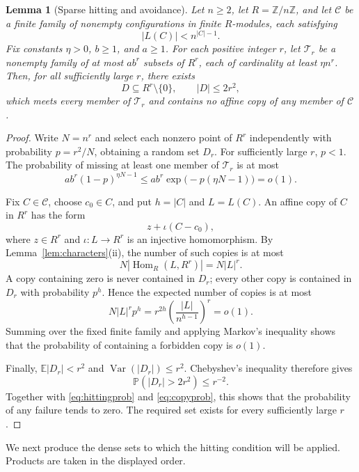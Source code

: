 \documentclass[10pt,a4paper]{amsart}
\newtheorem{lemma}[theorem]{Lemma}
\numberwithin{equation}{section}
\newcommand{\Hom}{\operatorname{Hom}}
\newcommand{\Z}{\mathbb{Z}}
\newcommand{\E}{\mathbb{E}}
\newcommand{\Prb}{\mathbb{P}}
\newcommand{\calC}{\mathcal{C}}
\renewcommand{\leq}{\leqslant}
\renewcommand{\geq}{\geqslant}
\begin{document}
\begin{lemma}[Sparse hitting and avoidance]\label{lem:sparse}
Let $n\geq 2$, let $R=\Z/n\Z$, and let $\calC$ be a finite family of nonempty configurations in finite $R$-modules, each satisfying
\[
 |L(C)|<n^{|C|-1}.
\]
Fix constants $\eta>0$, $b\geq 1$, and $a\geq 1$. For each positive integer $r$, let $\mathcal{T}_r$ be a nonempty family of at most $ab^r$ subsets of $R^r$, each of cardinality at least $\eta n^r$. Then, for all sufficiently large $r$, there exists
\[
 D\subseteq R^r\setminus\{0\},\qquad |D|\leq 2r^2,
\]
which meets every member of $\mathcal{T}_r$ and contains no affine copy of any member of $\calC$.
\end{lemma}
\begin{proof}
Write $N=n^r$ and select each nonzero point of $R^r$ independently with probability $p=r^2/N$, obtaining a random set $D_r$. For sufficiently large $r$, $p<1$. The probability of missing at least one member of $\mathcal{T}_r$ is at most
\begin{equation}\label{eq:hittingprob}
 ab^r(1-p)^{\eta N-1}
 \leq ab^r\exp\bigl(-p(\eta N-1)\bigr)=o(1).
\end{equation}

Fix $C\in\calC$, choose $c_0\in C$, and put $h=|C|$ and $L=L(C)$. An affine copy of $C$ in $R^r$ has the form
\[
 z+\iota(C-c_0),
\]
where $z\in R^r$ and $\iota:L\to R^r$ is an injective homomorphism. By Lemma~\ref{lem:characters}(ii), the number of such copies is at most
\[
 N|\Hom_R(L,R^r)|=N|L|^r.
\]
A copy containing zero is never contained in $D_r$; every other copy is contained in $D_r$ with probability $p^h$. Hence the expected number of copies is at most
\begin{equation}\label{eq:copyprob}
 N|L|^r p^h
 =r^{2h}\left(\frac{|L|}{n^{h-1}}\right)^r=o(1).
\end{equation}
Summing over the fixed finite family and applying Markov's inequality shows that the probability of containing a forbidden copy is $o(1)$.

Finally, $\E|D_r|<r^2$ and $\operatorname{Var}(|D_r|)\leq r^2$. Chebyshev's inequality therefore gives
\[
 \Prb(|D_r|>2r^2)\leq r^{-2}.
\]
Together with \eqref{eq:hittingprob} and \eqref{eq:copyprob}, this shows that the probability of any failure tends to zero. The required set exists for every sufficiently large $r$.
\end{proof}

We next produce the dense sets to which the hitting condition will be applied. Products are taken in the displayed order.
\end{document}
